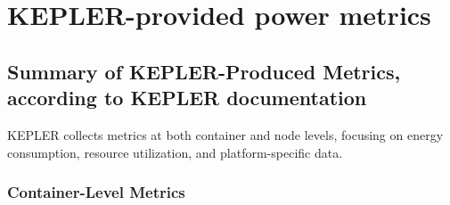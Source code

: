 

\chapter{KEPLER-provided power metrics} %

\label{AppendixA} %

\section{Summary of KEPLER-Produced Metrics,\\ according to KEPLER documentation\parencite{KEPLERDocumentation}}

KEPLER collects metrics at both container and node levels, focusing on energy consumption, resource utilization, and platform-specific data.

\subsection{Container-Level Metrics}


